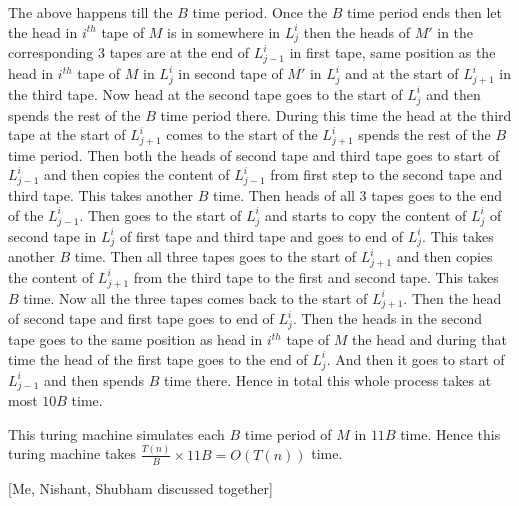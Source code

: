 \documentclass[a4paper, 11pt]{article}
\begin{document}
{The above happens till the $B$ time period. Once the $B$ time period ends then let  the head in $i^{th}$ tape of $M$ is in somewhere in $L_j^i$ then the heads of $M'$ in the corresponding 3 tapes  are at the end of $L_{j-1}^i$ in first tape, same position as the head in $i^{th}$ tape of $M$ in $L_j^i$ in second tape of $M'$ in $L_j^i$ and at the start of $L_{j+1}^i$ in the third tape. Now head at the second tape goes to the start of $L_j^i$ and then spends the rest of the $B$ time period there. During this time the head at the third tape at the start of $L_{j+1}^i$ comes to the start of the $L_{j+1}^i$ spends the rest of the $B$ time period. Then both the heads of second tape and third tape goes to start of $L_{j-1}^i$ and then copies the content of $L_{j-1}^i$ from first step to the second tape and third tape. This takes another $B$ time. Then heads of all 3 tapes goes to the end of the $L_{j-1}^i$. Then goes to the start of $L_j^i$ and starts to copy the content of $L_j^i$ of second tape in $L_j^i$ of first tape and third tape and goes to end of $L_j^i$. This takes another $B$ time. Then all three tapes goes to the start of $L_{j+1}^i$ and then copies the content of $L_{j+1}^i$ from the third tape to the first and second tape. This takes $B$ time. Now all the three tapes comes back to the start of $L_{j+1}^i$. Then the head of second tape and first tape goes to end of $L_{j}^i$. Then the heads in the second tape goes to the same position as head in $i^{th}$ tape of $M$ the head and during that time the head of the first tape goes to the end of $L_j^i$. And then it goes to start of $L_{j-1}^i$ and then spends $B$ time there. Hence in total this whole process takes at most $10B$ time. 

This turing machine simulates each $B$ time period of $M$ in $11B$ time. Hence this turing machine takes $\frac{T(n)}{B}\times 11B=O(T(n))$ time. 
}\parinf

[Me, Nishant, Shubham discussed together]
\parinn
\newpage

\end{document}
